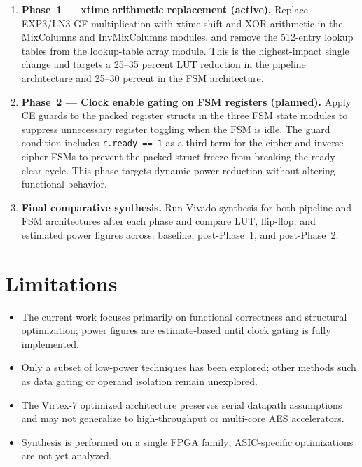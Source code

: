 \begin{enumerate}
  \item \textbf{Phase~1 --- xtime arithmetic replacement (active).}
        Replace EXP3/LN3 GF multiplication with xtime shift-and-XOR arithmetic in
        the MixColumns and InvMixColumns modules, and remove the 512-entry lookup
        tables from the lookup-table array module. This is the highest-impact single change and
        targets a 25--35 percent LUT reduction in the pipeline architecture and 25--30
        percent in the FSM architecture.

  \item \textbf{Phase~2 --- Clock enable gating on FSM registers (planned).}
        Apply CE guards to the packed register structs in the three FSM state modules to
        suppress unnecessary register toggling when the FSM is idle. The guard condition
        includes \texttt{r.ready == 1} as a third term for the cipher and inverse cipher FSMs
        to prevent the packed struct freeze from breaking the ready-clear cycle. This phase
        targets dynamic power reduction without altering functional behavior.

  \item \textbf{Final comparative synthesis.}
        Run Vivado synthesis for both pipeline and FSM architectures after each phase and
        compare LUT, flip-flop, and estimated power figures across: baseline, post-Phase~1,
        and post-Phase~2.
\end{enumerate}


\section{Limitations}

\begin{itemize}
  \item The current work focuses primarily on functional correctness and structural
        optimization; power figures are estimate-based until clock gating is fully implemented.
  \item Only a subset of low-power techniques has been explored; other methods such as data
        gating or operand isolation remain unexplored.
  \item The Virtex-7 optimized architecture preserves serial datapath assumptions and may not
        generalize to high-throughput or multi-core AES accelerators.
  \item Synthesis is performed on a single FPGA family; ASIC-specific optimizations are not yet
        analyzed.
\end{itemize}



